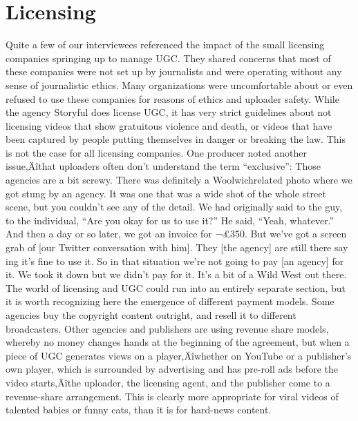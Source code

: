 \documentclass[symmetric, notoc, nobib]{towcenter-book}
\begin{document}
\section{Licensing}
Quite a few of our interviewees referenced the impact of the small licensing
companies springing up to manage UGC. They shared concerns that
most of these companies were not set up by journalists and were operating
without any sense of journalistic ethics. Many organizations were uncomfortable
about or even refused to use these companies for reasons of ethics
and uploader safety.
While the agency Storyful does license UGC, it has very strict guidelines
about not licensing videos that show gratuitous violence and death, or videos
that have been captured by people putting themselves in danger or
breaking the law. This is not the case for all licensing companies.
One producer noted another issue‚Äîthat uploaders often don't understand
the term ``exclusive'':
Those agencies are a bit screwy. There was definitely a Woolwichrelated
photo where we got stung by an agency. It was one that was
a wide shot of the whole street scene, but you couldn't see any of the
detail. We had originally said to the guy, to the individual, ``Are you
okay for us to use it?'' He said, ``Yeah, whatever.'' And then a day or so
later, we got an invoice for ¬£350. But we've got a screen grab of [our
Twitter conversation with him]. They [the agency] are still there say
ing it's fine to use it. So in that situation we're not going to pay [an
agency] for it. We took it down but we didn't pay for it. It's a bit of a
Wild West out there.
The world of licensing and UGC could run into an entirely separate section,
but it is worth recognizing here the emergence of different payment
models. Some agencies buy the copyright content outright, and resell it to
different broadcasters. Other agencies and publishers are using revenue
share models, whereby no money changes hands at the beginning of the
agreement, but when a piece of UGC generates views on a player‚Äîwhether
on YouTube or a publisher's own player, which is surrounded by advertising
and has pre-roll ads before the video starts‚Äîthe uploader, the licensing
agent, and the publisher come to a revenue-share arrangement. This is
clearly more appropriate for viral videos of talented babies or funny cats,
than it is for hard-news content.
\end{document}
